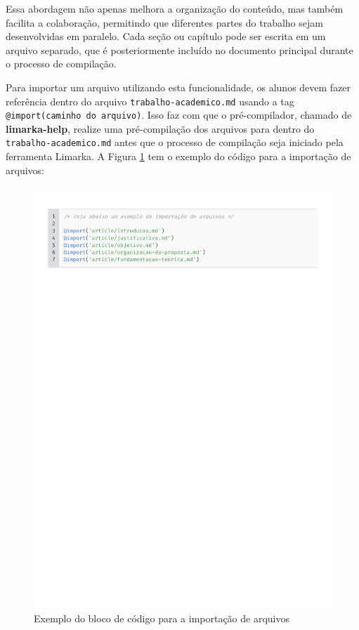 \documentclass[
	12pt,				%
	oneside,			%
	a4paper,			%
	english,			%
	french,				%
	spanish,			%
	brazil				%
	]{abntex2}
\begin{document}
Essa abordagem não apenas melhora a organização do conteúdo, mas também
facilita a colaboração, permitindo que diferentes partes do trabalho
sejam desenvolvidas em paralelo. Cada seção ou capítulo pode ser escrita
em um arquivo separado, que é posteriormente incluído no documento
principal durante o processo de compilação.

Para importar um arquivo utilizando esta funcionalidade, os alunos devem
fazer referência dentro do arquivo \texttt{trabalho-academico.md} usando
a tag
\texttt{@import(\textquotesingle{}caminho\ do\ arquivo\textquotesingle{})}.
Isso faz com que o pré-compilador, chamado de \textbf{limarka-help},
realize uma pré-compilação dos arquivos para dentro do
\texttt{trabalho-academico.md} antes que o processo de compilação seja
iniciado pela ferramenta Limarka. A Figura \ref{markdown_import_code}
tem o exemplo do código para a importação de arquivos:

\begin{figure}[htbp]
\hypertarget{markdown_import_code}{%
\caption{Exemplo do bloco de código para a importação de arquivos}\label{markdown_import_code}
\begin{center}
\includegraphics[scale=0.8]{imagens/code/markdown-import-code.pdf}
\end{center}
}
\end{figure}
\end{document}
